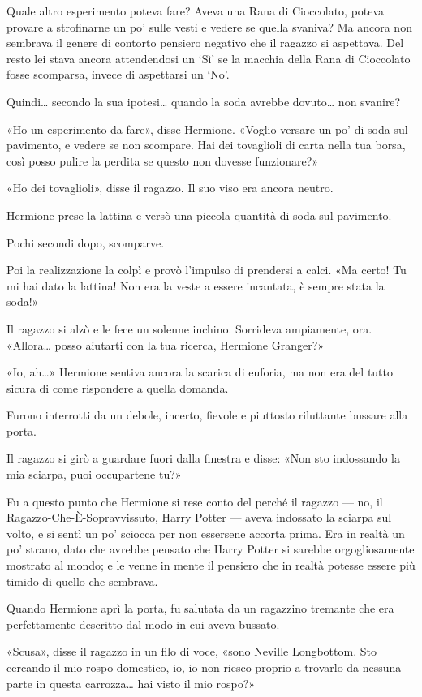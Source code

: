 Quale altro esperimento poteva fare? Aveva una Rana di Cioccolato, poteva provare a strofinarne un po’ sulle vesti e vedere se quella svaniva? Ma ancora non sembrava il genere di contorto pensiero negativo che il ragazzo si aspettava. Del resto lei stava ancora attendendosi un ‘Sì’ se la macchia della Rana di Cioccolato fosse scomparsa, invece di aspettarsi un ‘No’.

Quindi… secondo la sua ipotesi… quando la soda avrebbe dovuto… non svanire?

«Ho un esperimento da fare», disse Hermione. «Voglio versare un po’ di soda sul pavimento, e vedere se non scompare. Hai dei tovaglioli di carta nella tua borsa, così posso pulire la perdita se questo non dovesse funzionare?»

«Ho dei tovaglioli», disse il ragazzo. Il suo viso era ancora neutro.

Hermione prese la lattina e versò una piccola quantità di soda sul pavimento.

Pochi secondi dopo, scomparve.

Poi la realizzazione la colpì e provò l’impulso di prendersi a calci. «Ma certo! Tu mi hai dato la lattina! Non era la veste a essere incantata, è sempre stata la soda!»

Il ragazzo si alzò e le fece un solenne inchino. Sorrideva ampiamente, ora. «Allora… posso aiutarti con la tua ricerca, Hermione Granger?»

«Io, ah…» Hermione sentiva ancora la scarica di euforia, ma non era del tutto sicura di come rispondere a quella domanda.

Furono interrotti da un debole, incerto, fievole e piuttosto riluttante bussare alla porta.

Il ragazzo si girò a guardare fuori dalla finestra e disse: «Non sto indossando la mia sciarpa, puoi occupartene tu?»

Fu a questo punto che Hermione si rese conto del perché il ragazzo — no, il Ragazzo-Che-È-Sopravvissuto, Harry Potter — aveva indossato la sciarpa sul volto, e si sentì un po’ sciocca per non essersene accorta prima. Era in realtà un po’ strano, dato che avrebbe pensato che Harry Potter si sarebbe orgogliosamente mostrato al mondo; e le venne in mente il pensiero che in realtà potesse essere più timido di quello che sembrava.

Quando Hermione aprì la porta, fu salutata da un ragazzino tremante che era perfettamente descritto dal modo in cui aveva bussato.

«Scusa», disse il ragazzo in un filo di voce, «sono Neville Longbottom. Sto cercando il mio rospo domestico, io, io non riesco proprio a trovarlo da nessuna parte in questa carrozza… hai visto il mio rospo?»

